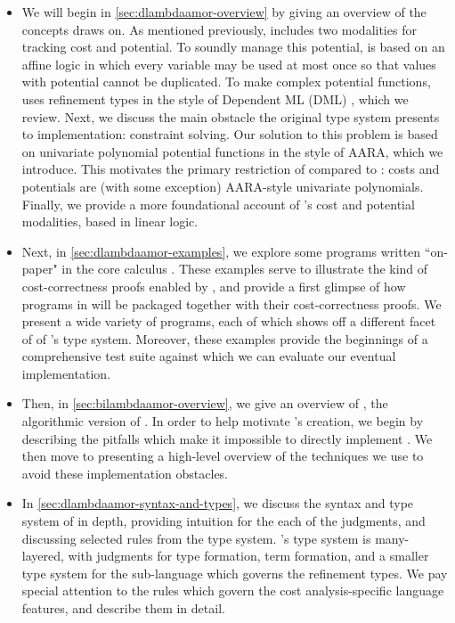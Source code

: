 \begin{itemize}
 \item We will begin in \autoref{sec:dlambdaamor-overview} by giving an overview of the concepts \lambdaamor draws on. As mentioned previously, \lambdaamor includes two modalities for tracking cost and potential. To soundly manage this potential, \lambdaamor is based on an affine logic in which every variable may be used at most once so that values with potential cannot be duplicated. To make complex potential functions, \lambdaamor uses refinement types in the style of Dependent ML (DML) \cite{xi:jfp07}, which we review. Next, we discuss the main obstacle the original type system presents to implementation: constraint solving. Our solution to this problem is based on univariate polynomial potential functions in the style of AARA, which we introduce. This motivates the primary restriction of \dlambdaamor compared to \lambdaamor: costs and potentials are (with some exception) AARA-style univariate polynomials. Finally, we provide a more foundational account of \dlambdaamor's cost and potential modalities, based in linear logic.
 
 \item Next, in \autoref{sec:dlambdaamor-examples}, we explore some programs written ``on-paper" in the core calculus \dlambdaamor. These examples serve to illustrate the kind of cost-correctness proofs enabled by \dlambdaamor, and provide a first glimpse of how programs in \lambdaamorimpl will be packaged together with their cost-correctness proofs.  We present a wide variety of programs, each of which shows off a different facet of of \dlambdaamor's type system. Moreover, these examples provide the beginnings of a comprehensive test suite against which we can evaluate our eventual implementation.
 
 \item Then, in \autoref{sec:bilambdaamor-overview}, we give an overview of \bilambdaamor, the algorithmic version of \dlambdaamor. In order to help motivate \bilambdaamor's creation, we begin by describing the pitfalls which make it impossible to directly implement \dlambdaamor. We then move to presenting a high-level overview of the techniques we use to avoid these implementation obstacles.
 
 
 \item In \autoref{sec:dlambdaamor-syntax-and-types}, we discuss the syntax and type system of \dlambdaamor in depth, providing intuition for the each of the judgments, and discussing selected rules from the type system. \dlambdaamor's type system is many-layered, with judgments for type formation, term formation, and a smaller type system for the sub-language which governs the refinement types. We pay special attention to the rules which govern the cost analysis-specific language features, and describe them in detail.
 

\end{itemize}

